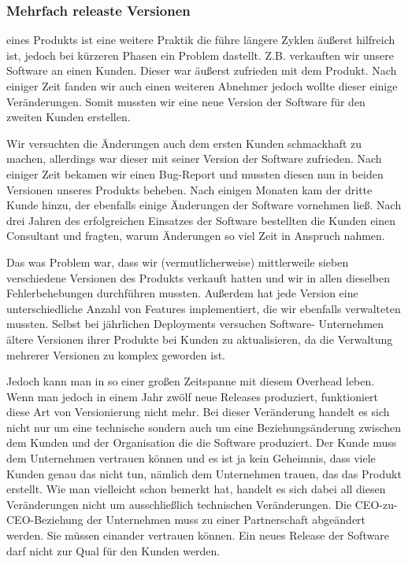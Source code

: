 \subsubsection{Mehrfach releaste Versionen}
eines Produkts ist eine weitere Praktik die führe längere Zyklen äußerst
hilfreich ist, jedoch bei kürzeren Phasen ein Problem dastellt. Z.B.
verkauften wir unsere Software an einen Kunden. Dieser war äußerst zufrieden
mit dem Produkt.  Nach einiger Zeit fanden wir auch einen weiteren Abnehmer
jedoch wollte dieser einige Veränderungen. Somit mussten wir eine neue Version
der Software für den zweiten Kunden erstellen.

Wir versuchten die Änderungen auch dem ersten Kunden schmackhaft zu machen,
allerdings war dieser mit seiner Version der Software zufrieden. Nach einiger
Zeit bekamen wir einen Bug-Report und mussten diesen nun in beiden Versionen
unseres Produkts beheben. Nach einigen Monaten kam der dritte Kunde hinzu, der
ebenfalls einige Änderungen der Software vornehmen ließ. Nach drei Jahren des
erfolgreichen Einsatzes der Software bestellten die Kunden einen Consultant
und fragten, warum Änderungen so viel Zeit in Anspruch nahmen.

Das was Problem war, dass wir (vermutlicherweise) mittlerweile sieben
verschiedene Versionen des Produkts verkauft hatten und wir in allen dieselben
Fehlerbehebungen durchführen mussten. Außerdem hat jede Version eine
unterschiedliche Anzahl von Features implementiert, die wir ebenfalls
verwalteten mussten. Selbst bei jährlichen Deployments versuchen Software-
Unternehmen ältere Versionen ihrer Produkte bei Kunden zu aktualisieren, da
die Verwaltung mehrerer Versionen zu komplex geworden ist.

Jedoch kann man in so einer großen Zeitspanne mit diesem Overhead leben. Wenn
man jedoch in einem Jahr zwölf neue Releases produziert, funktioniert diese
Art von Versionierung nicht mehr. Bei dieser Veränderung handelt es sich nicht
nur um eine technische sondern auch um eine Beziehungsänderung zwischen dem
Kunden und der Organisation die die Software produziert. Der Kunde muss dem
Unternehmen vertrauen können und es ist ja kein Geheimnis, dass viele Kunden
genau das nicht tun, nämlich dem Unternehmen trauen, das das Produkt erstellt.
Wie man vielleicht schon bemerkt hat, handelt es sich dabei all diesen
Veränderungen nicht um ausschließlich technischen Veränderungen. Die CEO-zu-
CEO-Beziehung der Unternehmen muss zu einer Partnerschaft abgeändert werden.
Sie müssen einander vertrauen können. Ein neues Release der Software darf
nicht zur Qual für den Kunden werden.


